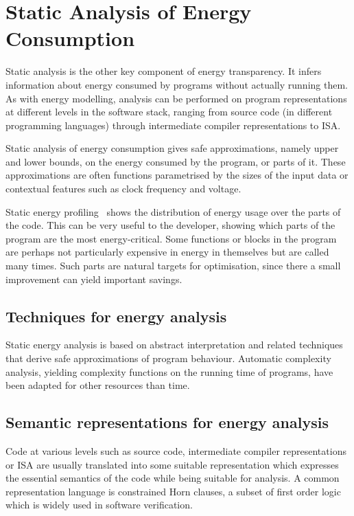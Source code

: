 
\section{Static Analysis of Energy Consumption}\label{sec:energy-analysis}

Static analysis is the other key component of energy transparency.
It infers information about energy consumed by programs without
actually running them. As with energy modelling, analysis can be performed on
program representations at different levels 
in the software stack, ranging from source code (in different programming
languages) through intermediate compiler representations to ISA.

Static analysis of energy consumption 
gives safe approximations, namely upper and lower bounds, on the energy
consumed by the program, or parts of it. These approximations are often
functions parametrised by the sizes of the input data or contextual
features such as clock frequency and voltage. 

Static energy profiling~\cite{staticprofiling-flops} shows the
distribution of energy usage over the parts of the code. This can be
very useful to the developer, showing which parts of the program are the
most energy-critical. Some functions or blocks in the program are
perhaps not particularly expensive in energy in themselves but are
called many times. Such parts are natural targets for optimisation,
since there a small improvement can yield important savings. 

\subsection{Techniques for energy analysis}

Static energy analysis is based on abstract interpretation and related techniques that
derive safe approximations of program behaviour. Automatic complexity analysis, 
yielding complexity functions on the running time of programs, have been adapted for
other resources than time. 

\subsection{Semantic representations for energy analysis}
Code at various levels such as  source code, intermediate compiler representations or ISA
are usually translated into some suitable representation which expresses
the essential semantics of the code while being suitable for analysis.  A common representation 
language is constrained Horn
clauses, a subset of first order logic which is widely used in software verification.

